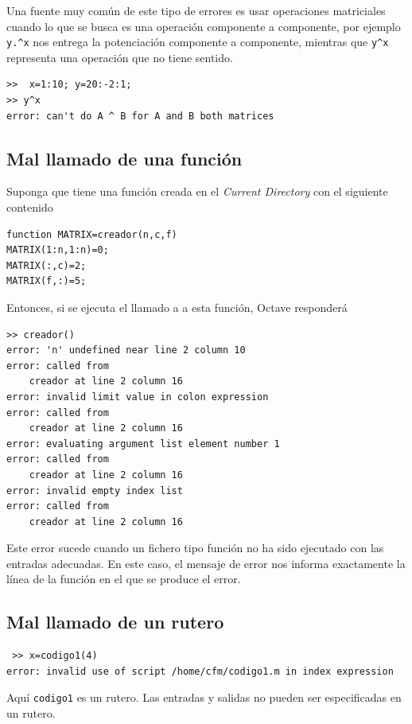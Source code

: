\documentclass[letter,11pt]{article}
\newcommand\0{\mathbf{0}}
\newcommand{\octave}{{\sc Octave }}
\begin{document}
Una fuente muy com\'un de este tipo de errores es usar operaciones matriciales cuando lo que se busca es una operaci\'on componente a componente, por ejemplo \texttt{y.\^{}x} nos entrega la potenciaci\'on componente a componente, mientras que \texttt{y\^{}x} representa una operaci\'on que no tiene sentido.
\begin{lstlisting}
>>  x=1:10; y=20:-2:1;
>> y^x
error: can't do A ^ B for A and B both matrices
\end{lstlisting}

\subsection{Mal llamado de una funci\'on}
Suponga que tiene una funci\'on creada en el \textit{Current Directory} con el siguiente contenido
\begin{lstlisting}
function MATRIX=creador(n,c,f)
MATRIX(1:n,1:n)=0;
MATRIX(:,c)=2;
MATRIX(f,:)=5;
\end{lstlisting}
Entonces, si se ejecuta el llamado a a esta funci\'on, \octave responder\'a
\begin{lstlisting}
>> creador()
error: 'n' undefined near line 2 column 10
error: called from
    creador at line 2 column 16
error: invalid limit value in colon expression
error: called from
    creador at line 2 column 16
error: evaluating argument list element number 1
error: called from
    creador at line 2 column 16
error: invalid empty index list
error: called from
    creador at line 2 column 16
\end{lstlisting}
Este error sucede cuando un fichero tipo funci\'on no ha sido ejecutado con las entradas adecuadas. En este caso, el mensaje de error nos informa exactamente la l\'inea de la funci\'on en el que se produce el error.

\subsection{Mal llamado de un rutero}
\begin{lstlisting}
 >> x=codigo1(4)
error: invalid use of script /home/cfm/codigo1.m in index expression
\end{lstlisting}
Aqu\'i \texttt{codigo1} es un rutero. Las entradas y salidas no pueden ser especificadas en un rutero.
\end{document}

